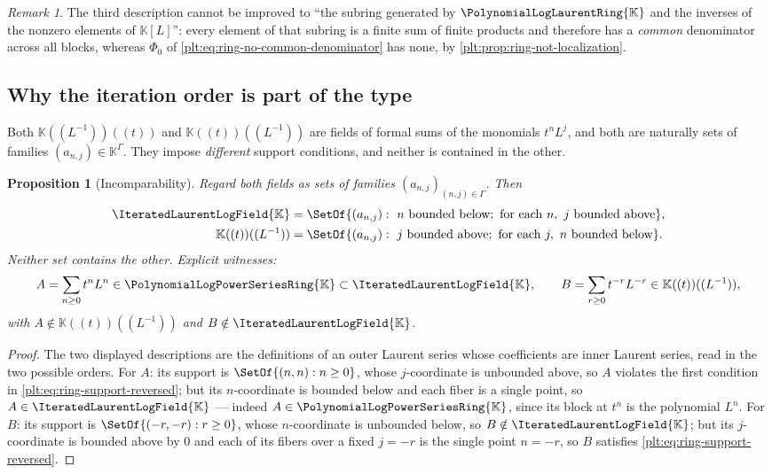 \documentclass[11pt,oneside]{article}
\theoremstyle{plain}
\newtheorem{proposition}[theorem]{Proposition}
\theoremstyle{definition}
\theoremstyle{remark}
\newtheorem{remark}[theorem]{Remark}
\newcommand{\K}{\mathbb{K}}
\newcommand{\PLpow}{\PolynomialLogPowerSeriesRing{\K}}   %
\newcommand{\PLlau}{\PolynomialLogLaurentRing{\K}}       %
\newcommand{\PLit}{\IteratedLaurentLogField{\K}}         %
\begin{document}
\begin{remark}
\label{plt:rmk:ring-not-generated}
The third description cannot be improved to ``the subring generated by
\(\PLlau\) and the inverses of the nonzero elements of \(\K[L]\)'': every
element of that subring is a finite sum of finite products and therefore has
a \emph{common} denominator across all blocks, whereas
\(\Phi_0\) of \eqref{plt:eq:ring-no-common-denominator} has none, by
\cref{plt:prop:ring-not-localization}.
\end{remark}

\subsection{Why the iteration order is part of the type}
\label{plt:sec:ring-iteration-order}

Both \(\K((L^{-1}))((t))\) and \(\K((t))((L^{-1}))\) are fields of formal sums
of the monomials \(t^nL^j\), and both are naturally sets of families
\((a_{n,j})\in\K^{\Gamma}\).  They impose \emph{different} support conditions,
and neither is contained in the other.

\begin{proposition}[Incomparability]
\label{plt:prop:ring-iteration-order}
Regard both fields as sets of families \((a_{n,j})_{(n,j)\in\Gamma}\).  Then
\begin{align}
  \PLit&=\SetOf{(a_{n,j}):\ n\ \text{bounded below};\ \text{for each }n,\
    j\ \text{bounded above}},\label{plt:eq:ring-support-PLit}\\
  \K((t))((L^{-1}))&=\SetOf{(a_{n,j}):\ j\ \text{bounded above};\
    \text{for each }j,\ n\ \text{bounded below}}.
    \label{plt:eq:ring-support-reversed}
\end{align}
Neither set contains the other.  Explicit witnesses:
\begin{equation}\label{plt:eq:ring-order-witnesses}
  A=\sum_{n\ge0}t^nL^n\in\PLpow\subset\PLit,
  \qquad
  B=\sum_{r\ge0}t^{-r}L^{-r}\in\K((t))((L^{-1})),
\end{equation}
with \(A\notin\K((t))((L^{-1}))\) and \(B\notin\PLit\).
\end{proposition}

\begin{proof}
The two displayed descriptions are the definitions of an outer Laurent series
whose coefficients are inner Laurent series, read in the two possible orders.
For \(A\): its support is \(\SetOf{(n,n):n\ge0}\), whose \(j\)-coordinate is
unbounded above, so \(A\) violates the first condition in
\eqref{plt:eq:ring-support-reversed}; but its \(n\)-coordinate is bounded
below and each fiber is a single point, so \(A\in\PLit\) --- indeed
\(A\in\PLpow\), since its block at \(t^n\) is the polynomial \(L^n\).
For \(B\): its support is \(\SetOf{(-r,-r):r\ge0}\), whose \(n\)-coordinate is
unbounded below, so \(B\notin\PLit\); but its \(j\)-coordinate is bounded above
by \(0\) and each of its fibers over a fixed \(j=-r\) is the single point
\(n=-r\), so \(B\) satisfies \eqref{plt:eq:ring-support-reversed}.
\end{proof}
\end{document}
